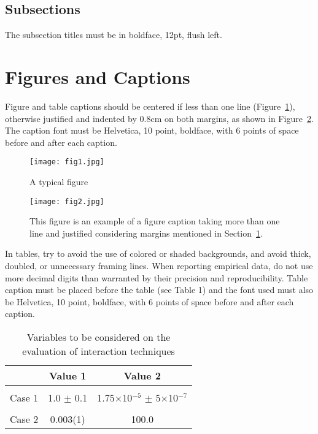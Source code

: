 \documentclass[12pt]{article}
\begin{document}
\subsection{Subsections}

The subsection titles must be in boldface, 12pt, flush left.

\section{Figures and Captions}\label{sec:figs}


Figure and table captions should be centered if less than one line
(Figure~\ref{fig:exampleFig1}), otherwise justified and indented by 0.8cm on
both margins, as shown in Figure~\ref{fig:exampleFig2}. The caption font must
be Helvetica, 10 point, boldface, with 6 points of space before and after each
caption.

\begin{figure}[ht]
\centering
\texttt{[image: fig1.jpg]}
\caption{A typical figure}
\label{fig:exampleFig1}
\end{figure}

\begin{figure}[ht]
\centering
\texttt{[image: fig2.jpg]}
\caption{This figure is an example of a figure caption taking more than one
  line and justified considering margins mentioned in Section~\ref{sec:figs}.}
\label{fig:exampleFig2}
\end{figure}

In tables, try to avoid the use of colored or shaded backgrounds, and avoid
thick, doubled, or unnecessary framing lines. When reporting empirical data,
do not use more decimal digits than warranted by their precision and
reproducibility. Table caption must be placed before the table (see Table 1)
and the font used must also be Helvetica, 10 point, boldface, with 6 points of
space before and after each caption.

\begin{table}[ht]
\centering
\caption{Variables to be considered on the evaluation of interaction
  techniques}
\label{tab:exTable1}
\smallskip
\begin{tabular}{|l|c|c|}
\hline
& Value 1 & Value 2\\[0.5ex]
\hline
&&\\[-2ex]
Case 1 & 1.0 $\pm$ 0.1 & 1.75$\times$10$^{-5}$ $\pm$ 5$\times$10$^{-7}$\\[0.5ex]
\hline
&&\\[-2ex]
Case 2 & 0.003(1) & 100.0\\[0.5ex]
\hline
\end{tabular}
\end{table}
\end{document}
